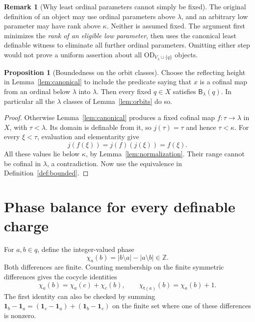 \documentclass[11pt,letterpaper]{article}
\theoremstyle{definition}
\newtheorem{proposition}[definition]{Proposition}
\newtheorem{remark}[definition]{Remark}
\newcommand{\OD}{\mathrm{OD}}
\newcommand{\Blam}[1]{\mathsf B_\lambda(#1)}
\newcommand{\ODq}{\OD_{V_\lambda\cup\{q\}}}
\newcommand{\ind}{\mathbf 1}
\newcommand{\tail}{\mathsf t}
\begin{document}
\begin{remark}[Why least ordinal parameters cannot simply be fixed]
The original definition of an object may use ordinal parameters above $\lambda$, and an arbitrary low parameter may have rank above $\kappa$. Neither is assumed fixed. The argument first minimizes the \emph{rank of an eligible low parameter}, then uses the canonical least definable witness to eliminate all further ordinal parameters. Omitting either step would not prove a uniform assertion about all $\ODq$ objects.
\end{remark}

\begin{proposition}[Boundedness on the orbit classes]\label{prop:localbounded}
Choose the reflecting height in Lemma~\ref{lem:canonical} to include the predicate saying that $x$ is a cofinal map from an ordinal below $\lambda$ into $\lambda$. Then every fixed $q\in X$ satisfies $\Blam q$. In particular all the $\lambda$ classes of Lemma~\ref{lem:orbits} do so.
\end{proposition}

\begin{proof}
Otherwise Lemma~\ref{lem:canonical} produces a fixed cofinal map $f:\tau\to\lambda$ in $X$, with $\tau<\lambda$. Its domain is definable from it, so $j(\tau)=\tau$ and hence $\tau<\kappa$. For every $\xi<\tau$, evaluation and elementarity give
\[
 j(f(\xi))=j(f)(j(\xi))=f(\xi).
\]
All these values lie below $\kappa$, by Lemma~\ref{lem:normalization}. Their range cannot be cofinal in $\lambda$, a contradiction. Now use the equivalence in Definition~\ref{def:bounded}.
\end{proof}

\section{Phase balance for every definable charge}\label{sec:phase}

For $a,b\in q$, define the integer-valued phase
\[
 \chi_a(b)=|b\setminus a|-|a\setminus b|\in\mathbb Z.
\]
Both differences are finite. Counting membership on the finite symmetric differences gives the cocycle identities
\begin{equation}\label{eq:cocycle}
 \chi_a(b)=\chi_a(c)+\chi_c(b),
 \qquad \chi_{\tail(a)}(b)=\chi_a(b)+1.
\end{equation}
The first identity can also be checked by summing $\ind_b-\ind_a=(\ind_c-\ind_a)+(\ind_b-\ind_c)$ on the finite set where one of these differences is nonzero.
\end{document}
